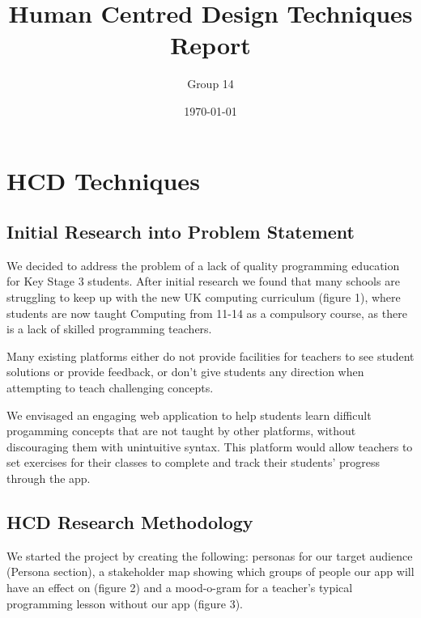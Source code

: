 \documentclass[a4wide, 11pt]{article}
\title{\vspace{-2.0cm}Human Centred Design Techniques Report}
\author{\vspace{-2.0cm}Group 14}
\date{\vspace{-2.0cm}\today}         %
\begin{document}
\maketitle            %


\section{HCD Techniques}

\subsection{Initial Research into Problem Statement}

We decided to address the problem of a lack of quality programming education for Key Stage 3 students. After initial research we found that many schools are struggling to keep up with the new UK computing curriculum (figure 1), where students are now taught Computing from 11-14 as a compulsory course, as there is a lack of skilled programming teachers.

Many existing platforms either do not provide facilities for teachers to see student solutions or provide feedback, or don't give students any direction when attempting to teach challenging concepts.

We envisaged an engaging web application to help students learn difficult progamming concepts that are not taught by other platforms, without discouraging them with unintuitive syntax. This platform would allow teachers to set exercises for their classes to complete and track their students' progress through the app.

\subsection{HCD Research Methodology}

We started the project by creating the following: personas for our target audience (Persona section), a stakeholder map showing which groups of people our app will have an effect on (figure 2) and a mood-o-gram for a teacher's typical programming lesson without our app (figure 3).
\end{document}
